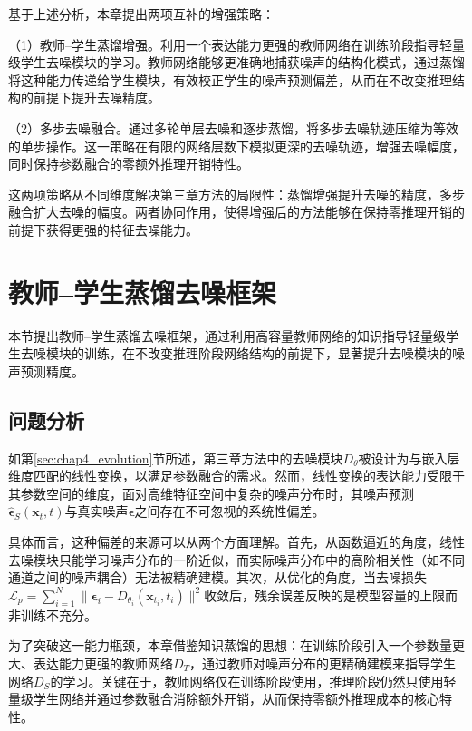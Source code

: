 基于上述分析，本章提出两项互补的增强策略：

（1）教师--学生蒸馏增强。利用一个表达能力更强的教师网络在训练阶段指导轻量级学生去噪模块的学习。教师网络能够更准确地捕获噪声的结构化模式，通过蒸馏将这种能力传递给学生模块，有效校正学生的噪声预测偏差，从而在不改变推理结构的前提下提升去噪精度。

（2）多步去噪融合。通过多轮单层去噪和逐步蒸馏，将多步去噪轨迹压缩为等效的单步操作。这一策略在有限的网络层数下模拟更深的去噪轨迹，增强去噪幅度，同时保持参数融合的零额外推理开销特性。

这两项策略从不同维度解决第三章方法的局限性：蒸馏增强提升去噪的精度，多步融合扩大去噪的幅度。两者协同作用，使得增强后的方法能够在保持零推理开销的前提下获得更强的特征去噪能力。

\section{教师--学生蒸馏去噪框架}
\label{sec:chap4_distill}

本节提出教师--学生蒸馏去噪框架，通过利用高容量教师网络的知识指导轻量级学生去噪模块的训练，在不改变推理阶段网络结构的前提下，显著提升去噪模块的噪声预测精度。

\subsection{问题分析}

如第\ref{sec:chap4_evolution}节所述，第三章方法中的去噪模块$D_\theta$被设计为与嵌入层维度匹配的线性变换，以满足参数融合的需求。然而，线性变换的表达能力受限于其参数空间的维度，面对高维特征空间中复杂的噪声分布时，其噪声预测$\hat{\boldsymbol{\epsilon}}_S(\mathbf{x}_t, t)$与真实噪声$\boldsymbol{\epsilon}$之间存在不可忽视的系统性偏差。

具体而言，这种偏差的来源可以从两个方面理解。首先，从函数逼近的角度，线性去噪模块只能学习噪声分布的一阶近似，而实际噪声分布中的高阶相关性（如不同通道之间的噪声耦合）无法被精确建模。其次，从优化的角度，当去噪损失$\mathcal{L}_p = \sum_{i=1}^{N}\|\boldsymbol{\epsilon}_i - D_{\theta_i}(\mathbf{x}_{t_i}, t_i)\|^2$收敛后，残余误差反映的是模型容量的上限而非训练不充分。

为了突破这一能力瓶颈，本章借鉴知识蒸馏\cite{hinton2015distilling}的思想：在训练阶段引入一个参数量更大、表达能力更强的教师网络$D_T$，通过教师对噪声分布的更精确建模来指导学生网络$D_S$的学习。关键在于，教师网络仅在训练阶段使用，推理阶段仍然只使用轻量级学生网络并通过参数融合消除额外开销，从而保持零额外推理成本的核心特性。

